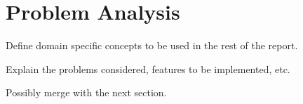 \chapter{Problem Analysis}

Define domain specific concepts to be used in the rest of the report.

Explain the problems considered, features to be implemented, etc. 

Possibly merge with the next section.
